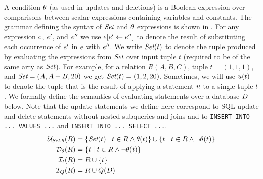 A condition $\theta$ (as used in updates and deletions) is a Boolean expression over %
comparisons between scalar expressions containing variables and constants. The grammar defining the syntax of $\textit{Set}$ and $\theta$ expressions is shown in . For any expression $e$, $e'$, and $e''$ we use ${e}[e' \gets e'']$ to denote the result of substituting each occurrence of $e'$ in $e$ with $e''$. We write $\textit{Set}(t)$ to denote the tuple produced by evaluating the expressions from $\textit{Set}$ over input tuple $t$ (required to be of the same arty as $\textit{Set}$). For example, for a relation $R(A, B, C)$, tuple $t = (1, 1, 1)$, and  $\textit{Set} = (A, A + B, 20)$ we get $\textit{Set}(t) = (1, 2, 20)$. %
Sometimes, we will use $u(t)$ to denote the tuple that is the result of applying a statement $u$ to a single tuple $t$.
We formally define the semantics of evaluating statements over a database $D$ below. Note that the update statements we define here correspond to SQL update and delete statements without nested subqueries and joins and to \lstinline!INSERT INTO ... VALUES ...! and \lstinline!INSERT INTO ... SELECT ...!.
\begin{align}
  \mathcal{U}_{\textit{Set},\theta}(R) &= \{ \textit{Set}(t) \mid t \in R \wedge \theta(t) \} \cup \{ t \mid t \in R \wedge \neg \theta(t) \} \label{eq:update-sem}\\
  \mathcal{D}_{\theta}(R) &= \{ t \mid t \in R \wedge \neg \theta(t) \} \label{eq:delete-sem}\\
  \mathcal{I}_{t}(R) &= R \cup \{ t \} \label{eq:const-insert-sem}\\
  \mathcal{I}_{Q}(R) &= R \cup Q(D) \label{eq:query-insert-sem}
\end{align}


